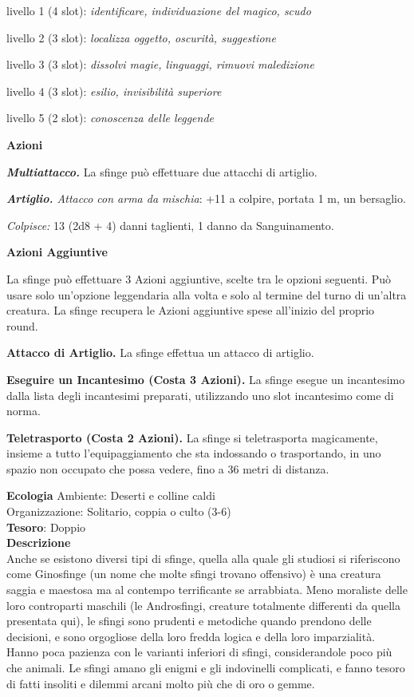 \begin{multicols}{2}
	livello 1 (4 slot): \textit{identificare, individuazione del magico, scudo}

	livello 2 (3 slot): \textit{localizza oggetto, oscurità, suggestione}

	livello 3 (3 slot): \textit{dissolvi magie, linguaggi, rimuovi maledizione}

	livello 4 (3 slot): \textit{esilio, invisibilità superiore}

	livello 5 (2 slot): \textit{conoscenza delle leggende}

	\textbf{Azioni}

	\textit{\textbf{Multiattacco.}} La sfinge può effettuare due attacchi di artiglio.

	\textit{\textbf{Artiglio.} Attacco con arma da mischia}: +11 a colpire, portata 1 m, un bersaglio.

	\textit{Colpisce:} 13 (2d8 + 4) danni taglienti, 1 danno da Sanguinamento.

	\textbf{Azioni Aggiuntive}

	La sfinge può effettuare 3 Azioni aggiuntive, scelte tra le opzioni seguenti. Può usare solo un'opzione leggendaria alla volta e solo al termine del turno di un'altra creatura. La sfinge recupera le Azioni aggiuntive spese all'inizio del proprio round.

	\textbf{Attacco di Artiglio.} La sfinge effettua un attacco di artiglio.

	\textbf{Eseguire un Incantesimo (Costa 3 Azioni).} La sfinge esegue un incantesimo dalla lista degli incantesimi preparati, utilizzando uno slot incantesimo come di norma.

	\textbf{Teletrasporto (Costa 2 Azioni).} La sfinge si teletrasporta magicamente, insieme a tutto l'equipaggiamento che sta indossando o trasportando, in uno spazio non occupato che possa vedere, fino a 36 metri di distanza.

	\textbf{Ecologia}
	Ambiente: Deserti e colline caldi\\
	Organizzazione: Solitario, coppia o culto (3-6)\\
	\textbf{Tesoro}: Doppio\\
	\textbf{Descrizione}\\
	Anche se esistono diversi tipi di sfinge, quella alla quale gli studiosi si riferiscono come Ginosfinge (un nome che molte sfingi trovano offensivo) è una creatura saggia e maestosa ma al contempo terrificante se arrabbiata. Meno moraliste delle loro controparti maschili (le Androsfingi, creature totalmente differenti da quella presentata qui), le sfingi sono prudenti e metodiche quando prendono delle decisioni, e sono orgogliose della loro fredda logica e della loro imparzialità. Hanno poca pazienza con le varianti inferiori di sfingi, considerandole poco più che animali. Le sfingi amano gli enigmi e gli indovinelli complicati, e fanno tesoro di fatti insoliti e dilemmi arcani molto più che di oro o gemme.


\end{multicols}

